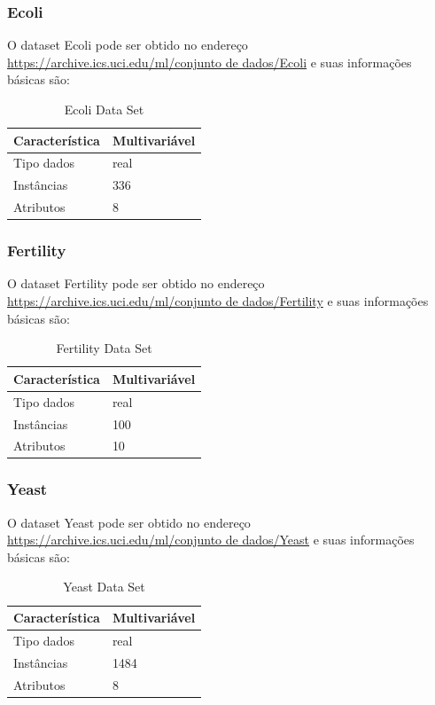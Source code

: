 \documentclass[12pt, a4paper]{article}
\begin{document}
\subsubsection{Ecoli}
O dataset Ecoli pode ser obtido no endereço \url{https://archive.ics.uci.edu/ml/conjunto de dados/Ecoli} e suas informações básicas são:
\begin{table}[!ht]
\centering
\caption{Ecoli Data Set}
\label{ecolitable}
\begin{tabular}{|l|l|}
\hline
Característica & Multivariável\\
\hline
Tipo dados & real\\
\hline
Instâncias & 336\\
\hline
Atributos & 8 \\
\hline
\end{tabular}
\end{table}

\subsubsection{Fertility}
O dataset Fertility pode ser obtido no endereço \url{https://archive.ics.uci.edu/ml/conjunto de dados/Fertility} e suas informações básicas são:
\begin{table}[!ht]
\centering
\caption{Fertility Data Set}
\label{fertilitytable}
\begin{tabular}{|l|l|}
\hline
Característica & Multivariável\\
\hline
Tipo dados & real\\
\hline
Instâncias & 100\\
\hline
Atributos & 10 \\
\hline
\end{tabular}
\end{table}

\subsubsection{Yeast}
O dataset Yeast pode ser obtido no endereço \url{https://archive.ics.uci.edu/ml/conjunto de dados/Yeast} e suas informações básicas são:
\begin{table}[!ht]
\centering
\caption{Yeast Data Set}
\label{yeasttable}
\begin{tabular}{|l|l|}
\hline
Característica & Multivariável\\
\hline
Tipo dados & real\\
\hline
Instâncias & 1484\\
\hline
Atributos & 8\\
\hline
\end{tabular}
\end{table}
\end{document}
